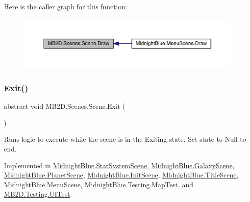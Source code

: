 Here is the caller graph for this function\+:\nopagebreak
\begin{figure}[H]
\begin{center}
\leavevmode
\includegraphics[width=350pt]{class_m_b2_d_1_1_scenes_1_1_scene_a932d33071ecb4c5187367825dba72324_icgraph}
\end{center}
\end{figure}
\hypertarget{class_m_b2_d_1_1_scenes_1_1_scene_a099b79e16d23b67349847999d2336813}{}\label{class_m_b2_d_1_1_scenes_1_1_scene_a099b79e16d23b67349847999d2336813} 
\subsubsection{\texorpdfstring{Exit()}{Exit()}}
{\footnotesize\ttfamily abstract void M\+B2\+D.\+Scenes.\+Scene.\+Exit (\begin{DoxyParamCaption}{ }\end{DoxyParamCaption})\hspace{0.3cm}{\ttfamily [pure virtual]}}



Runs logic to execute while the scene is in the Exiting state. Set state to Null to end. 



Implemented in \hyperlink{class_midnight_blue_1_1_star_system_scene_ad533ba93e597964d015099031a85cb77}{Midnight\+Blue.\+Star\+System\+Scene}, \hyperlink{class_midnight_blue_1_1_galaxy_scene_a7a96978e050da997330bcc0f3cd00f9e}{Midnight\+Blue.\+Galaxy\+Scene}, \hyperlink{class_midnight_blue_1_1_planet_scene_af3aab90a13294493e1f2cd29b0fb60e6}{Midnight\+Blue.\+Planet\+Scene}, \hyperlink{class_midnight_blue_1_1_init_scene_a16fc773b06a711e1ba35dda44e3edc3e}{Midnight\+Blue.\+Init\+Scene}, \hyperlink{class_midnight_blue_1_1_title_scene_aed29e37e9f849cc8f8443bae057a8eb8}{Midnight\+Blue.\+Title\+Scene}, \hyperlink{class_midnight_blue_1_1_menu_scene_acc60288dc2dff4d612b7a63615165de5}{Midnight\+Blue.\+Menu\+Scene}, \hyperlink{class_midnight_blue_1_1_testing_1_1_map_test_a7dfcf609b9fd898f377297a0075d2159}{Midnight\+Blue.\+Testing.\+Map\+Test}, and \hyperlink{class_m_b2_d_1_1_testing_1_1_u_i_test_ad7ad379db3fc9990e634b3edbd4b1a41}{M\+B2\+D.\+Testing.\+U\+I\+Test}.

